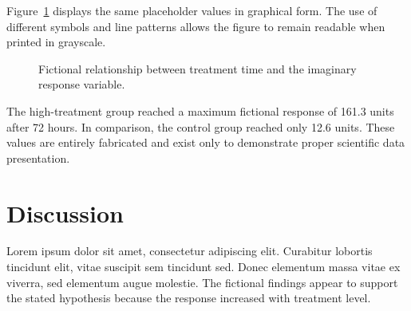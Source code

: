 \documentclass[11pt]{article}
\begin{document}
Figure~\ref{fig:resultsgraph} displays the same placeholder values in
graphical form. The use of different symbols and line patterns allows
the figure to remain readable when printed in grayscale.

\begin{figure}[H]
\centering


\caption{
Fictional relationship between treatment time and the imaginary
response variable.
}
\label{fig:resultsgraph}
\end{figure}

The high-treatment group reached a maximum fictional response of 161.3
units after 72 hours. In comparison, the control group reached only
12.6 units. These values are entirely fabricated and exist only to
demonstrate proper scientific data presentation.

\section{Discussion}

Lorem ipsum dolor sit amet, consectetur adipiscing elit. Curabitur
lobortis tincidunt elit, vitae suscipit sem tincidunt sed. Donec
elementum massa vitae ex viverra, sed elementum augue molestie. The
fictional findings appear to support the stated hypothesis because the
response increased with treatment level.
\end{document}
